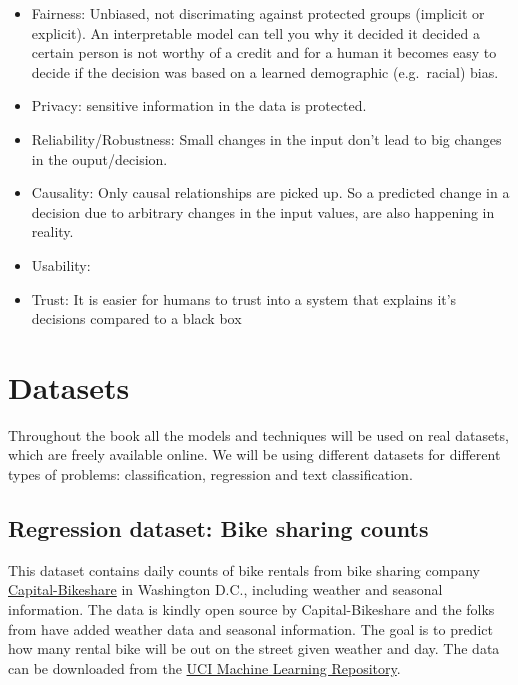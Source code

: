 \documentclass[12pt,]{krantz}
\providecommand{\tightlist}{%
  \setlength{\itemsep}{0pt}\setlength{\parskip}{0pt}}
\theoremstyle{definition}
\theoremstyle{definition}
\theoremstyle{definition}
\theoremstyle{remark}
\begin{document}
\begin{itemize}
\tightlist
\item
  Fairness: Unbiased, not discrimating against protected groups
  (implicit or explicit). An interpretable model can tell you why it
  decided it decided a certain person is not worthy of a credit and for
  a human it becomes easy to decide if the decision was based on a
  learned demographic (e.g.~racial) bias.
\item
  Privacy: sensitive information in the data is protected.
\item
  Reliability/Robustness: Small changes in the input don't lead to big
  changes in the ouput/decision.
\item
  Causality: Only causal relationships are picked up. So a predicted
  change in a decision due to arbitrary changes in the input values, are
  also happening in reality.
\item
  Usability:
\item
  Trust: It is easier for humans to trust into a system that explains
  it's decisions compared to a black box
\end{itemize}

\chapter{Datasets}\label{datasets}

Throughout the book all the models and techniques will be used on real
datasets, which are freely available online. We will be using different
datasets for different types of problems: classification, regression and
text classification.

\section{Regression dataset: Bike sharing
counts}\label{regression-dataset-bike-sharing-counts}

This dataset contains daily counts of bike rentals from bike sharing
company \href{https://www.capitalbikeshare.com/}{Capital-Bikeshare} in
Washington D.C., including weather and seasonal information. The data is
kindly open source by Capital-Bikeshare and the folks from
\citep{bike2013} have added weather data and seasonal information. The
goal is to predict how many rental bike will be out on the street given
weather and day. The data can be downloaded from the
\href{http://archive.ics.uci.edu/ml/datasets/Bike+Sharing+Dataset}{UCI
Machine Learning Repository}.
\end{document}
